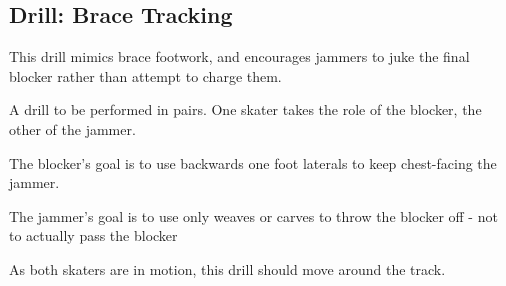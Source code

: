 \subsection*{Drill: Brace Tracking}
\label{drill:one_on_one/tracking}

This drill mimics brace footwork, and encourages jammers to juke the final blocker rather than attempt to charge them.

A drill to be performed in pairs.
One skater takes the role of the blocker, the other of the jammer.

The blocker's goal is to use backwards one foot laterals to keep chest-facing the jammer. 

The jammer's goal is to use only weaves or carves to throw the blocker off - not to actually pass the blocker 

As both skaters are in motion, this drill should move around the track.

